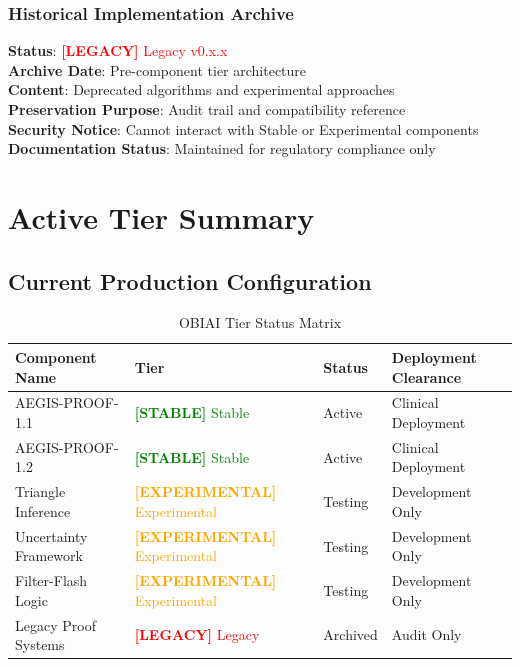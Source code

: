 \documentclass[11pt,letterpaper]{article}
\newcommand{\stablecomponent}[1]{\textcolor{green}{\textbf{[STABLE]} #1}}
\newcommand{\experimentalcomponent}[1]{\textcolor{orange}{\textbf{[EXPERIMENTAL]} #1}}
\newcommand{\legacycomponent}[1]{\textcolor{red}{\textbf{[LEGACY]} #1}}
\begin{document}
\subsubsection{Historical Implementation Archive}
\textbf{Status}: \legacycomponent{Legacy v0.x.x} \\
\textbf{Archive Date}: Pre-component tier architecture \\
\textbf{Content}: Deprecated algorithms and experimental approaches \\
\textbf{Preservation Purpose}: Audit trail and compatibility reference \\
\textbf{Security Notice}: Cannot interact with Stable or Experimental components \\
\textbf{Documentation Status}: Maintained for regulatory compliance only

\section{Active Tier Summary}
\label{sec:tier_summary}

\subsection{Current Production Configuration}

\begin{table}[htbp]
\centering
\begin{tabular}{p{4cm}|p{2cm}|p{3cm}|p{4cm}}
\toprule
\textbf{Component Name} & \textbf{Tier} & \textbf{Status} & \textbf{Deployment Clearance} \\
\midrule
AEGIS-PROOF-1.1 & \stablecomponent{Stable} & Active & Clinical Deployment \\
AEGIS-PROOF-1.2 & \stablecomponent{Stable} & Active & Clinical Deployment \\
Triangle Inference & \experimentalcomponent{Experimental} & Testing & Development Only \\
Uncertainty Framework & \experimentalcomponent{Experimental} & Testing & Development Only \\
Filter-Flash Logic & \experimentalcomponent{Experimental} & Testing & Development Only \\
Legacy Proof Systems & \legacycomponent{Legacy} & Archived & Audit Only \\
\bottomrule
\end{tabular}
\caption{OBIAI Tier Status Matrix}
\end{table}
\end{document}
